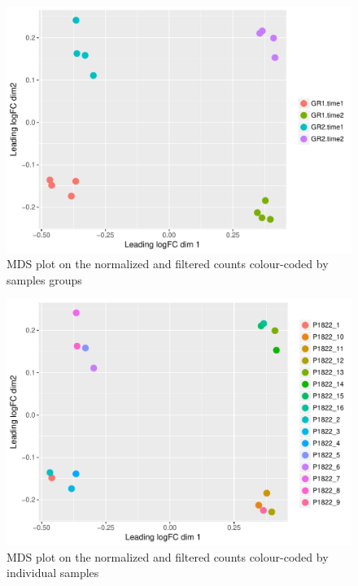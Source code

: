 \documentclass[12pt]{article}
\begin{document}
\begin{figure}[H]
\begin{center}
\includegraphics{9999_report-fig1}
\end{center}
\caption{MDS plot on the normalized and filtered counts colour-coded by samples groups}
\end{figure}  

\begin{figure}[H]
\begin{center}
\includegraphics{9999_report-fig2}
\end{center}
\caption{MDS plot on the normalized and filtered counts colour-coded by individual samples}
\end{figure} 
\end{document}
